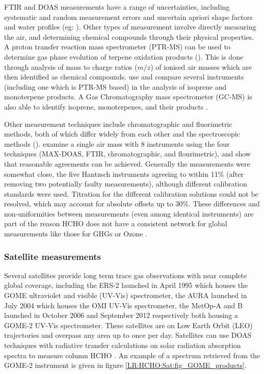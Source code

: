     FTIR and DOAS measurements have a range of uncertainties, including systematic and random measurement errors and uncertain apriori shape factors and water profiles (eg: \cite{Franco2015}).
    Other types of measurement involve directly measuring the air, and determining chemical compounds through their physical properties.
    A proton transfer reaction mass spectrometer (PTR-MS) can be used to determine gas phase evolution of terpene oxidation products (\cite[eg.]{Lee2006a,Nguyen2014,Wolfe2016}).
    This is done through analysis of mass to charge ratios ($m/z$) of ionised air masses which are then identified as chemical compounds.
    \cite{Nguyen2014} use and compare several instruments (including one which is PTR-MS based) in the analysis of isoprene and monoterpene products.
    A Gas Chromatography mass spectrometer (GC-MS) is also able to identify isoprene, monoterpenes, and their products \cite[eg.]{Nguyen2014,Lerner2017}.
        
    Other measurement techniques include chromatographic and fluorimetric methods, both of which differ widely from each other and the spectroscopic methods (\cite{Hak2005}).
    \cite{Hak2005} examine a single air mass with 8 instruments using the four techniques (MAX-DOAS, FTIR, chromatographic, and flourimetric), and show that reasonable agreements can be achieved.
    Generally the measurements were somewhat close, the five Hantzsch instruments agreeing to within 11\% (after removing two potentially faulty measurements), although different calibration standards were used.
    Titration for the different calibration solutions could not be resolved, which may account for absolute offsets up to 30\%.
    These differences and non-uniformities between measurements (even among identical instruments) are part of the reason HCHO does not have a consistent network for global measurements like those for GHGs or Ozone \citep{FortemsCheiney2012}.
  
    
  
    \subsubsection{Satellite measurements}
      \label{LR:HCHO:Sat}
      
      Several satellites provide long term trace gas observations with near complete global coverage, including the ERS-2 launched in April 1995 which houses the GOME ultraviolet and visible (UV-Vis) spectrometer, the AURA launched in July 2004 which houses the OMI UV-Vis spectrometer, the MetOp-A and B launched in October 2006 and September 2012 respectively both housing a GOME-2 UV-Vis spectrometer.
      These satellites are on Low Earth Orbit (LEO) trajectories and overpass any area up to once per day.
      Satellites can use DOAS techniques with radiative transfer calculations on solar radiation absorption spectra to measure column HCHO .
      An example of a spectrum retrieved from the GOME-2 instrument is given in figure \ref{LR:HCHO:Sat:fig_GOME_products}.
      
